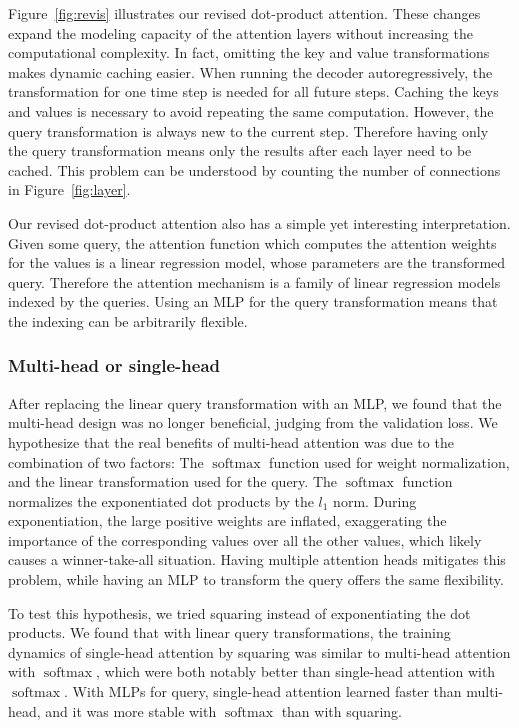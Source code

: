 \documentclass[11pt]{article}
\DeclareMathOperator{\softmax}{softmax}
\begin{document}
Figure~\ref{fig:revis} illustrates our revised dot-product attention.
These changes expand the modeling capacity of the attention layers
without increasing the computational complexity.
In fact, omitting the key and value transformations makes dynamic caching easier.
When running the decoder autoregressively,
the transformation for one time step is needed for all future steps.
Caching the keys and values is necessary to avoid repeating the same computation.
However, the query transformation is always new to the current step.
Therefore having only the query transformation means only the results after each layer need to be cached.
This problem can be understood by counting the number of connections in Figure~\ref{fig:layer}.

Our revised dot-product attention also has a simple yet interesting interpretation.
Given some query, the attention function which computes the attention weights for the values
is a linear regression model,
whose parameters are the transformed query.
Therefore the attention mechanism is a family of linear regression models indexed by the queries.
Using an MLP for the query transformation means that the indexing can be arbitrarily flexible.

\subsubsection*{Multi-head or single-head}

After replacing the linear query transformation with an MLP,
we found that the multi-head design was no longer beneficial,
judging from the validation loss.
We hypothesize that the real benefits of multi-head attention was due to the combination of two factors:
The \(\softmax\) function used for weight normalization,
and the linear transformation used for the query.
The \(\softmax\) function normalizes the exponentiated dot products by the \(l_{1}\) norm.
During exponentiation, the large positive weights are inflated,
exaggerating the importance of the corresponding values over all the other values,
which likely causes a winner-take-all situation.
Having multiple attention heads mitigates this problem,
while having an MLP to transform the query offers the same flexibility.

To test this hypothesis, we tried squaring instead of exponentiating the dot products.
We found that with linear query transformations,
the training dynamics of single-head attention by squaring was similar to
multi-head attention with \(\softmax\), which were both notably better than single-head attention with \(\softmax\).
With MLPs for query, single-head attention learned faster than multi-head,
and it was more stable with \(\softmax\) than with squaring.
\end{document}
